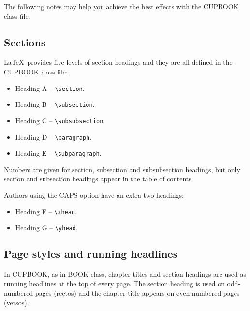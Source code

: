 \documentclass[cup6a]{cupbook}
\begin{document}
The following notes may help you achieve the best effects with the
CUPBOOK class file.

\subsection{Sections}

\LaTeX\ provides five levels of section headings and they are all
defined in the CUPBOOK class file:
\begin{itemize}\listsize
  \item Heading A -- \verb"\section".
  \item Heading B -- \verb"\subsection".
  \item Heading C -- \verb"\subsubsection".
  \item Heading D -- \verb"\paragraph".
  \item Heading E -- \verb"\subparagraph".
\end{itemize}
 Numbers are given for section, subsection and subsubsection headings,
but only section and subsection headings appear in the table of contents.

Authors using the CAPS option have an extra two headings:
\begin{itemize}\listsize
  \item Heading F -- \verb"\xhead".
  \item Heading G -- \verb"\yhead".
\end{itemize}

\subsection{Page styles and running headlines}

In CUPBOOK, as in BOOK class, chapter titles and section headings are
used as running headlines at the top of every page.
 The section heading is used on odd-numbered pages (rectos) and the
chapter title appears on even-numbered pages (versos).
\end{document}
